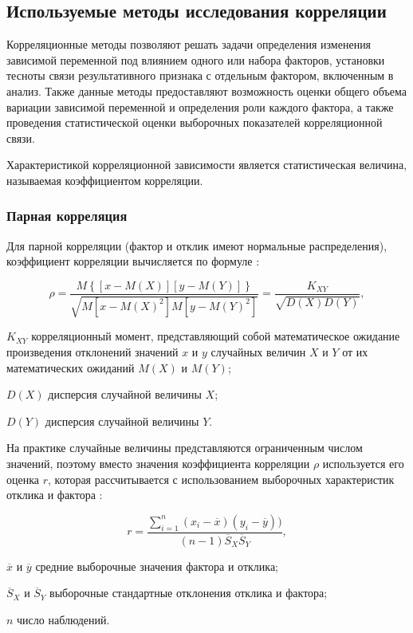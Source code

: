 \subsection{Используемые методы исследования корреляции}
Корреляционные методы позволяют решать задачи определения изменения зависимой переменной под влиянием одного или набора факторов, установки тесноты связи результативного признака с отдельным фактором, включенным в анализ. Также данные методы предоставляют возможность оценки общего объема вариации зависимой переменной и определения роли каждого фактора, а также проведения статистической оценки выборочных показателей корреляционной связи. \cite{correlInEco}

Характеристикой корреляционной зависимости является статистическая величина, называемая коэффициентом корреляции. \cite{corelMethod}

\subsubsection{Парная корреляция}

Для парной корреляции (фактор и отклик имеют нормальные распределения), коэффициент корреляции вычисляется по формуле \cite{corelMethod}:

\begin{equation}
\label{eq:corelPara}
\rho = \frac{M\left \{\left[x-M\left(X\right)\right]\left[y-M(Y)\right]\right \}}{\sqrt{M\left[x-M\left(X\right)^2\right]M\left[y-M\left(Y\right)^2\right]}} = \frac{K_{XY}}{\sqrt{D\left(X\right)D\left (Y\right)}},
\end{equation}
\begin{eqexpl}[15mm]
\item{$K_{XY}$} корреляционный момент, представляющий собой математическое ожидание произведения отклонений значений $x$ и $y$ случайных величин $X$ и $Y$ от их математических ожиданий $M(X)$ и $M(Y)$;
\item{$D(X)$} дисперсия случайной величины $X$;
\item{$D(Y)$} дисперсия случайной величины $Y$.
\end{eqexpl}

На практике случайные величины представляются ограниченным числом значений, поэтому вместо значения коэффициента корреляции $\rho$ используется его оценка $r$, которая рассчитывается с использованием выборочных характеристик отклика и фактора \cite{corelMethod}:

\begin{equation}
\label{eq:corelMark}
r = \frac{\sum_{i = 1}^{n}(x_i - \overline{x})(y_i - \overline{y}))}{(n - 1)\overline{S}_X \overline{S}_Y},
\end{equation}
\begin{eqexpl}[20mm]
\item{$\overline{x}$ и $\overline{y}$} средние выборочные значения фактора и отклика;
\item{$\overline{S}_X$ и $\overline{S}_Y$} выборочные стандартные отклонения отклика и фактора;
\item{$n$} число наблюдений.
\end{eqexpl}

